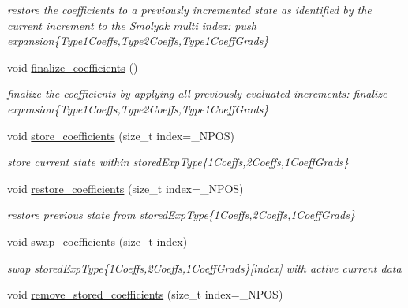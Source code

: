 \begin{DoxyCompactItemize}
\begin{DoxyCompactList}\small\item\em restore the coefficients to a previously incremented state as identified by the current increment to the Smolyak multi index\+: push expansion\{Type1\+Coeffs,Type2\+Coeffs,Type1\+Coeff\+Grads\} \end{DoxyCompactList}\item 
void \hyperlink{classPecos_1_1HierarchInterpPolyApproximation_a742e0217d6f681e08f401409771f4f4a}{finalize\+\_\+coefficients} ()\label{classPecos_1_1HierarchInterpPolyApproximation_a742e0217d6f681e08f401409771f4f4a}

\begin{DoxyCompactList}\small\item\em finalize the coefficients by applying all previously evaluated increments\+: finalize expansion\{Type1\+Coeffs,Type2\+Coeffs,Type1\+Coeff\+Grads\} \end{DoxyCompactList}\item 
void \hyperlink{classPecos_1_1HierarchInterpPolyApproximation_abc17a7104c33d8146f4a0ee7b6c6f37a}{store\+\_\+coefficients} (size\+\_\+t index=\+\_\+\+N\+P\+OS)\label{classPecos_1_1HierarchInterpPolyApproximation_abc17a7104c33d8146f4a0ee7b6c6f37a}

\begin{DoxyCompactList}\small\item\em store current state within stored\+Exp\+Type\{1\+Coeffs,2\+Coeffs,1\+Coeff\+Grads\} \end{DoxyCompactList}\item 
void \hyperlink{classPecos_1_1HierarchInterpPolyApproximation_ad05b093ee96314c9e05bad8e06c2dae7}{restore\+\_\+coefficients} (size\+\_\+t index=\+\_\+\+N\+P\+OS)\label{classPecos_1_1HierarchInterpPolyApproximation_ad05b093ee96314c9e05bad8e06c2dae7}

\begin{DoxyCompactList}\small\item\em restore previous state from stored\+Exp\+Type\{1\+Coeffs,2\+Coeffs,1\+Coeff\+Grads\} \end{DoxyCompactList}\item 
void \hyperlink{classPecos_1_1HierarchInterpPolyApproximation_af5c6af74d2c8c5575fefb46ce55af90d}{swap\+\_\+coefficients} (size\+\_\+t index)\label{classPecos_1_1HierarchInterpPolyApproximation_af5c6af74d2c8c5575fefb46ce55af90d}

\begin{DoxyCompactList}\small\item\em swap stored\+Exp\+Type\{1\+Coeffs,2\+Coeffs,1\+Coeff\+Grads\}\mbox{[}index\mbox{]} with active current data \end{DoxyCompactList}\item 
void \hyperlink{classPecos_1_1HierarchInterpPolyApproximation_a63d12cc6021fda4896b8738d72dfcc86}{remove\+\_\+stored\+\_\+coefficients} (size\+\_\+t index=\+\_\+\+N\+P\+OS)\label{classPecos_1_1HierarchInterpPolyApproximation_a63d12cc6021fda4896b8738d72dfcc86}


\end{DoxyCompactItemize}
